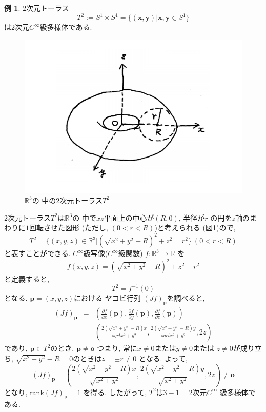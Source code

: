 \documentclass[a4j,12pt]{jarticle}
\theoremstyle{definition}
\newtheorem{example}[theorem]{例}
\begin{document}
\begin{example}
    $2$次元トーラス
    $$T^2:=S^1\times S^1=
    \{(\boldsymbol{x},\boldsymbol{y})|
    \boldsymbol{x},\boldsymbol{y}\in S^1\}$$
    は$2$次元$C^\infty$級多様体である. 
    \begin{figure}[H]
        \centering
        \includegraphics[keepaspectratio, scale=0.4]{T2Noshadow.pdf}
        \caption{$\mathbb{R}^3$の
        中の$2$次元トーラス$T^2$}
        \label{T2Noshadow}
       \end{figure}
    $2$次元トーラス$T^2$は$\mathbb{R}^3$の
    中で$xz$平面上の中心が$(R,0)$, 半径が$r$
    の円を$z$軸のまわりに$1$回転させた図形
    (ただし, $(0<r<R)$)と考えられる
    (図\ref{T2Noshadow})ので, 
    $$T^2=\{(x,y,z)\in \mathbb{R}^3|
    (\sqrt{x^2+y^2}-R)^2+z^2=r^2\}\ (0<r<R)$$
    と表すことができる. 
    $C^\infty$級写像($C^\infty$級関数)
    $f:\mathbb{R}^3\to \mathbb{R}$
    を
    $$f(x,y,z)=(\sqrt{x^2+y^2}-R)^2+z^2-r^2$$
    と定義すると, 
    $$T^2=f^{-1}(0)$$
    となる. $\boldsymbol{p}=(x,y,z)$における
    ヤコビ行列
    $(Jf)_{\boldsymbol{p}}$を調べると, 
    \begin{eqnarray*}
        (Jf)_{\boldsymbol{p}}&=&
        \left(\frac{\partial f}{\partial x}
        (\boldsymbol{p}), \frac{\partial f}{\partial y}
        (\boldsymbol{p}), \frac{\partial f}{\partial z}
        (\boldsymbol{p})\right)\\
        &=&
        \left(\frac{2(\sqrt{x^2+y^2}-R)x}
        {sqrt{x^2+y^2}},\frac{2(\sqrt{x^2+y^2}-R)y}
        {sqrt{x^2+y^2}},2z\right)
    \end{eqnarray*}
    であり, $\boldsymbol{p}\in T^2$のとき, 
    $\boldsymbol{p}\neq \boldsymbol{o}$
    つまり, 常に$x\neq 0$または$y\neq 0$または
    $z\neq 0$が成り立ち, 
    $\sqrt{x^2+y^2}-R=0$のときは$z=\pm r\neq 0$
    となる. よって, 
    $$(Jf)_{\boldsymbol{p}}=
    \left(\frac{2(\sqrt{x^2+y^2}-R)x}
        {\sqrt{x^2+y^2}},\frac{2(\sqrt{x^2+y^2}-R)y}
        {\sqrt{x^2+y^2}},2z\right)\neq 
        \boldsymbol{o}$$
    となり, rank$(Jf)_{\boldsymbol{p}}=1$
    を得る. 
    したがって, $T^2$は$3-1=2$次元$C^\infty$
    級多様体である. 
\end{example}
\end{document}
